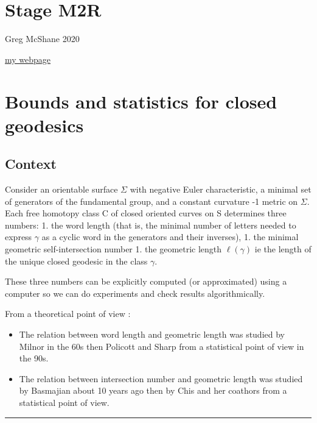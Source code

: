 \documentclass[
]{article}
\author{}
\date{}
\providecommand{\tightlist}{%
  \setlength{\itemsep}{0pt}\setlength{\parskip}{0pt}}
\begin{document}
\hypertarget{stage-m2r}{%
\section{Stage M2R}\label{stage-m2r}}

Greg McShane 2020

\href{https://macbuse.github.io/}{my webpage}

\hypertarget{bounds-and-statistics-for-closed-geodesics}{%
\section{Bounds and statistics for closed
geodesics}\label{bounds-and-statistics-for-closed-geodesics}}

\hypertarget{context}{%
\subsection{Context}\label{context}}

Consider an orientable surface \(\Sigma\) with negative Euler
characteristic, a minimal set of generators of the fundamental group,
and a constant curvature -1 metric on \(\Sigma\). Each free homotopy
class C of closed oriented curves on S determines three numbers: 1. the
word length (that is, the minimal number of letters needed to express
\(\gamma\) as a cyclic word in the generators and their inverses), 1.
the minimal geometric self-intersection number 1. the geometric length
\(\ell(\gamma)\) ie the length of the unique closed geodesic in the
class \(\gamma\).

These three numbers can be explicitly computed (or approximated) using a
computer so we can do experiments and check results algorithmically.

From a theoretical point of view :

\begin{itemize}
\tightlist
\item
  The relation between word length and geometric length was studied by
  Milnor in the 60s then Policott and Sharp from a statistical point of
  view in the 90s.
\item
  The relation between intersection number and geometric length was
  studied by Basmajian about 10 years ago then by Chis and her coathors
  from a statistical point of view.
\end{itemize}

\begin{center}\rule{0.5\linewidth}{0.5pt}\end{center}
\end{document}
